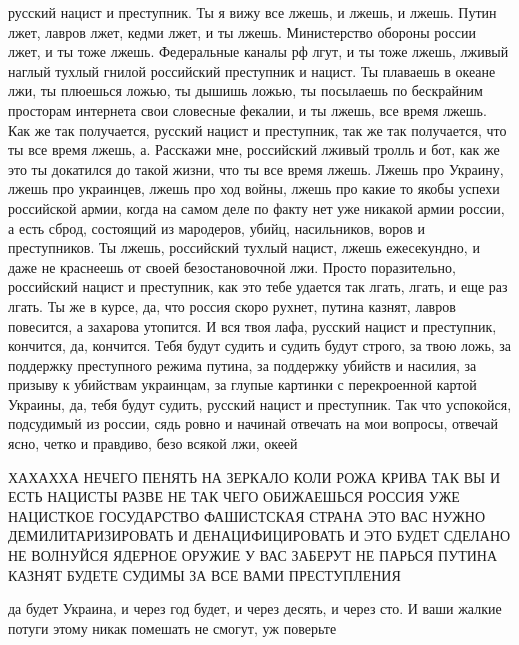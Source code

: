русский нацист и преступник. Ты я вижу все лжешь, и лжешь, и лжешь. Путин лжет,
лавров лжет, кедми лжет, и ты лжешь. Министерство обороны россии лжет, и ты
тоже лжешь.  Федеральные каналы рф лгут, и ты тоже лжешь, лживый наглый тухлый
гнилой российский преступник и нацист. Ты плаваешь в океане лжи, ты плюешься
ложью, ты дышишь ложью, ты посылаешь по бескрайним просторам интернета свои
словесные фекалии, и ты лжешь, все время лжешь.  Как же так получается, русский
нацист и преступник, так же так получается, что ты все время лжешь, а.
Расскажи мне, российский лживый тролль и бот, как же это ты докатился до такой
жизни, что ты все время лжешь. Лжешь про Украину, лжешь про украинцев, лжешь
про ход войны, лжешь про какие то якобы успехи российской армии, когда на самом
деле по факту нет уже никакой армии россии, а есть сброд, состоящий из
мародеров, убийц, насильников, воров и преступников. Ты лжешь, российский
тухлый нацист, лжешь ежесекундно, и даже не краснеешь от своей безостановочной
лжи. Просто поразительно, российский нацист и преступник, как это тебе удается
так лгать, лгать, и еще раз лгать. Ты же в курсе, да, что россия скоро рухнет,
путина казнят, лавров повесится, а захарова утопится. И вся твоя лафа, русский
нацист и преступник, кончится, да, кончится. Тебя будут судить и судить будут
строго, за твою ложь, за поддержку преступного режима путина, за поддержку
убийств и насилия, за призыву к убийствам украинцам, за глупые картинки с
перекроенной картой Украины, да, тебя будут судить, русский нацист и
преступник. Так что успокойся, подсудимый из россии, сядь ровно и начинай
отвечать на мои вопросы, отвечай ясно, четко и правдиво, безо всякой лжи,
океей

ХАХАХХА НЕЧЕГО ПЕНЯТЬ НА ЗЕРКАЛО КОЛИ РОЖА КРИВА ТАК ВЫ И ЕСТЬ НАЦИСТЫ РАЗВЕ НЕ
ТАК ЧЕГО ОБИЖАЕШЬСЯ РОССИЯ УЖЕ НАЦИСТКОЕ ГОСУДАРСТВО ФАШИСТСКАЯ СТРАНА ЭТО ВАС
НУЖНО ДЕМИЛИТАРИЗИРОВАТЬ И ДЕНАЦИФИЦИРОВАТЬ И ЭТО БУДЕТ СДЕЛАНО НЕ ВОЛНУЙСЯ
ЯДЕРНОЕ ОРУЖИЕ У ВАС ЗАБЕРУТ НЕ ПАРЬСЯ ПУТИНА КАЗНЯТ БУДЕТЕ СУДИМЫ ЗА ВСЕ ВАМИ
ПРЕСТУПЛЕНИЯ

да будет Украина, и через год будет, и через десять, и через сто. И ваши жалкие
потуги этому никак помешать не смогут, уж поверьте


